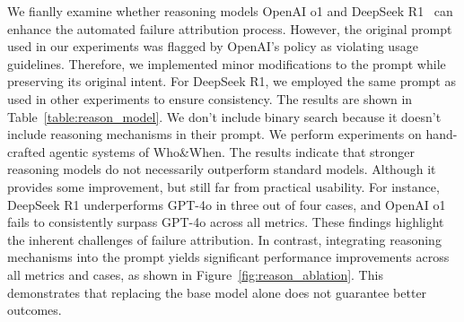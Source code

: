 We fianlly examine whether reasoning models OpenAI o1 and DeepSeek R1~\citep{DeepSeek2025R1} can enhance the automated failure attribution process. However, the original prompt used in our experiments was flagged by OpenAI's policy as violating usage guidelines. Therefore, we implemented minor modifications to the prompt while preserving its original intent. For DeepSeek R1, we employed the same prompt as used in other experiments to ensure consistency. The results are shown in Table~\ref{table:reason_model}. We don't include binary search because it doesn't include reasoning mechanisms in their prompt. We perform experiments on hand-crafted agentic systems of Who\&When.
The results indicate that stronger reasoning models do not necessarily outperform standard models. Although it provides some improvement, but still far from practical usability.
For instance, DeepSeek R1 underperforms GPT-4o in three out of four cases, and OpenAI o1 fails to consistently surpass GPT-4o across all metrics. These findings highlight the inherent challenges of failure attribution.
In contrast, integrating reasoning mechanisms into the prompt yields significant performance improvements across all metrics and cases, as shown in Figure~\ref{fig:reason_ablation}. This demonstrates that replacing the base model alone does not guarantee better outcomes.